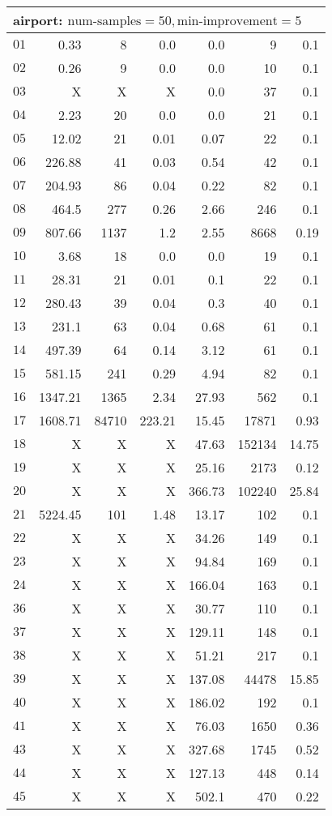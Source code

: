 \begin{longtable}{|c||r|r|r||r|r|r|}
\multicolumn{7}{|l|}{airport: $\text{num-samples}=50,\text{min-improvement}=5$}\\\hline
$01$ & 0.33 & 8 & 0.0 & 0.0 & 9 & 0.1 \\\hline
$02$ & 0.26 & 9 & 0.0 & 0.0 & 10 & 0.1 \\\hline
$03$ &  X &  X &  X & 0.0 & 37 & 0.1 \\\hline
$04$ & 2.23 & 20 & 0.0 & 0.0 & 21 & 0.1 \\\hline
$05$ & 12.02 & 21 & 0.01 & 0.07 & 22 & 0.1 \\\hline
$06$ & 226.88 & 41 & 0.03 & 0.54 & 42 & 0.1 \\\hline
$07$ & 204.93 & 86 & 0.04 & 0.22 & 82 & 0.1 \\\hline
$08$ & 464.5 & 277 & 0.26 & 2.66 & 246 & 0.1 \\\hline
$09$ & 807.66 & 1137 & 1.2 & 2.55 & 8668 & 0.19 \\\hline
$10$ & 3.68 & 18 & 0.0 & 0.0 & 19 & 0.1 \\\hline
$11$ & 28.31 & 21 & 0.01 & 0.1 & 22 & 0.1 \\\hline
$12$ & 280.43 & 39 & 0.04 & 0.3 & 40 & 0.1 \\\hline
$13$ & 231.1 & 63 & 0.04 & 0.68 & 61 & 0.1 \\\hline
$14$ & 497.39 & 64 & 0.14 & 3.12 & 61 & 0.1 \\\hline
$15$ & 581.15 & 241 & 0.29 & 4.94 & 82 & 0.1 \\\hline
$16$ & 1347.21 & 1365 & 2.34 & 27.93 & 562 & 0.1 \\\hline
$17$ & 1608.71 & 84710 & 223.21 & 15.45 & 17871 & 0.93 \\\hline
$18$ &  X &  X &  X & 47.63 & 152134 & 14.75 \\\hline
$19$ &  X &  X &  X & 25.16 & 2173 & 0.12 \\\hline
$20$ &  X &  X &  X & 366.73 & 102240 & 25.84 \\\hline
$21$ & 5224.45 & 101 & 1.48 & 13.17 & 102 & 0.1 \\\hline
$22$ &  X &  X &  X & 34.26 & 149 & 0.1 \\\hline
$23$ &  X &  X &  X & 94.84 & 169 & 0.1 \\\hline
$24$ &  X &  X &  X & 166.04 & 163 & 0.1 \\\hline
$36$ &  X &  X &  X & 30.77 & 110 & 0.1 \\\hline
$37$ &  X &  X &  X & 129.11 & 148 & 0.1 \\\hline
$38$ &  X &  X &  X & 51.21 & 217 & 0.1 \\\hline
$39$ &  X &  X &  X & 137.08 & 44478 & 15.85 \\\hline
$40$ &  X &  X &  X & 186.02 & 192 & 0.1 \\\hline
$41$ &  X &  X &  X & 76.03 & 1650 & 0.36 \\\hline
$43$ &  X &  X &  X & 327.68 & 1745 & 0.52 \\\hline
$44$ &  X &  X &  X & 127.13 & 448 & 0.14 \\\hline
$45$ &  X &  X &  X & 502.1 & 470 & 0.22 \\\hline


\end{longtable}
